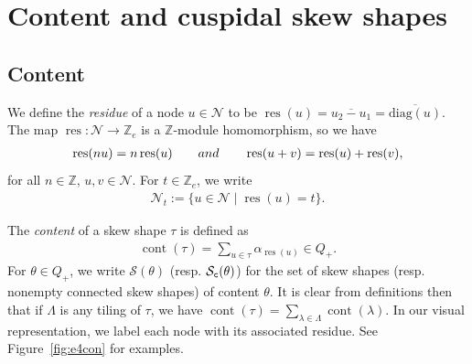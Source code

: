 \documentclass[Unicode,ALCO]{cedram}
\newcommand{\res}{\operatorname{res}}
\newcommand{\Z}{\mathbb{Z}}
\newcommand{\N}{\mathcal{N}}
\newcommand{\SSSS}{\mathcal{S}}
\newcommand{\0}{{\bar 0}}
\newcommand{\diag}{{\mathrm {diag}}}
\newcommand{\ZZ}{{\mathbb Z}}
\def\cont{{\operatorname{cont}}}
\begin{document}
\section{Content and cuspidal skew shapes}

\subsection{Content}\label{contentsec}
We define the {\em residue} of a node \(u \in \N\) to be 
\(\res(u) =\overline{u_2 - u_1} = \overline{\diag(u)}\).
The map \(\res: \N \to \Z_e\) is a \(\Z\)-module homomorphism, so we have
\begin{align*}
\res(n u) = n \res(u)
\qquad
\textup{and}
\qquad
\res(u+v) = \res(u) + \res(v),
\end{align*}
for all \(n \in \ZZ\), \(u,v \in \N\). For \(t \in \Z_e\), we write
\begin{align*}
\N_t := \{ u \in \N \mid \res(u) = t\}.
\end{align*}



The {\em content} of a skew shape \(\tau\) is defined as
\begin{align*}
\cont(\tau) = \sum_{u \in \tau} \alpha_{\res(u)} \in Q_+.
\end{align*}
For \(\theta \in Q_+\), we write \(\SSSS(\theta)\) (resp. \(\SSSS_{\tt c}(\theta)\)) for the set of skew shapes (resp. nonempty connected skew shapes) of content \(\theta\). It is clear from definitions then that if \(\Lambda\) is any tiling of \(\tau\), we have
\(
\cont(\tau) = \sum_{\lambda \in \Lambda} \cont(\lambda).
\)
In our visual representation, we label each node with its associated residue. See Figure~\ref{fig:e4con} for examples.
\end{document}
